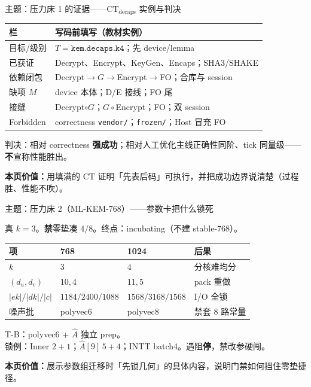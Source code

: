 \documentclass[UTF8,aspectratio=169,11pt]{ctexbeamer}
\newcommand{\pagesummary}[1]{%
  \vfill
  {\footnotesize\noindent\textbf{本页价值：}#1\par}%
}
\begin{document}
\begin{frame}{主题：压力床 1 的证据——$\mathrm{CT}_{\mathrm{decaps}}$ 实例与判决}
{\footnotesize
\begin{center}
\begin{tabular}{@{}L{1.8cm}L{10.4cm}@{}}
  \toprule
  栏 & 写码前填写（教材实例） \\
  \midrule
  目标/级别 & $T=\texttt{kem.decaps.k4}$；先 device/lemma \\
  已获证 & Decrypt、Encrypt、KeyGen、Encaps；SHA3/SHAKE \\
  依赖闭包 & Decrypt$\to G\to$Encrypt$\to$FO；合库与 session \\
  缺项 $M$ & device 本体；D/E 接线；FO 尾 \\
  接缝 & Decrypt$\circ G$；$G\circ$Encrypt；FO；双 session \\
  Forbidden & correctness \texttt{vendor/}；\texttt{frozen/}；Host 冒充 FO \\
  \bottomrule
\end{tabular}
\end{center}
}
{\footnotesize
判决：相对 correctness \textbf{强成功}；相对人工优化主线正确性同阶、tick 同量级——\textbf{不}宣称性能胜出。
}
\pagesummary{用填满的 $\mathrm{CT}$ 证明「先表后码」可执行，并把成功边界说清楚（过程胜、性能不吹）。}
\end{frame}

\begin{frame}{主题：压力床 2（ML-KEM-768）——参数卡把什么锁死}
{\footnotesize
真 $k{=}3$。\textbf{禁}零垫凑 $4/8$。终点：incubating（不建 stable-768）。
\begin{center}
\begin{tabular}{@{}L{2.2cm}L{2.6cm}L{2.6cm}L{4.0cm}@{}}
  \toprule
  项 & 768 & 1024 & 后果 \\
  \midrule
  $k$ & $3$ & $4$ & 分核难均分 \\
  $(d_u,d_v)$ & $10,4$ & $11,5$ & pack 重做 \\
  $|ek|/|dk|/|c|$ & $1184/2400/1088$ & $1568/3168/1568$ & I/O 全锁 \\
  噪声批 & polyvec6 & polyvec8 & 禁套 8 路常量 \\
  \bottomrule
\end{tabular}
\end{center}
T-B：polyvec6 + $\hat A$ 独立 prep。\\
锁例：Inner $2{+}1$；$\hat A[9]$\,$5{+}4$；INTT batch4。遇阻\textbf{停}，禁改参硬闯。
}
\pagesummary{展示参数组迁移时「先锁几何」的具体内容，说明门禁如何挡住零垫捷径。}
\end{frame}
\end{document}
